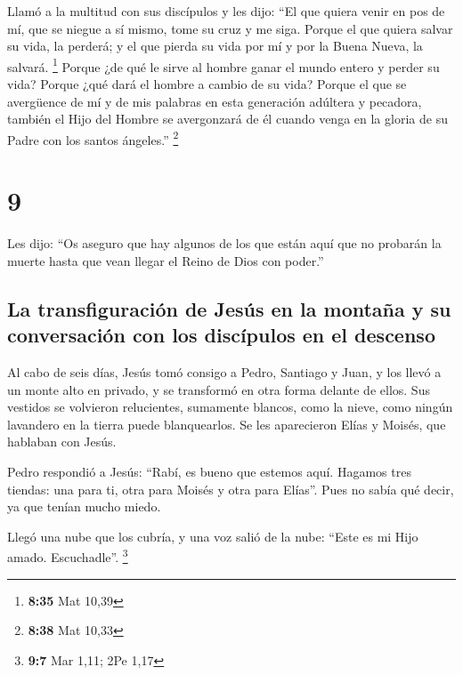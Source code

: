  Llamó a la multitud con sus discípulos y les dijo: ``El
que quiera venir en pos de mí, que se niegue a sí mismo, tome su cruz y
me siga.  Porque el que quiera salvar su vida, la
perderá; y el que pierda su vida por mí y por la Buena Nueva, la
salvará. \footnote{\textbf{8:35} Mat 10,39}  Porque ¿de
qué le sirve al hombre ganar el mundo entero y perder su vida?
 Porque ¿qué dará el hombre a cambio de su vida?
 Porque el que se avergüence de mí y de mis palabras en
esta generación adúltera y pecadora, también el Hijo del Hombre se
avergonzará de él cuando venga en la gloria de su Padre con los santos
ángeles.'' \footnote{\textbf{8:38} Mat 10,33}

\hypertarget{section-8}{%
\section{9}\label{section-8}}

 Les dijo: ``Os aseguro que hay algunos de los que están
aquí que no probarán la muerte hasta que vean llegar el Reino de Dios
con poder.''

\hypertarget{la-transfiguraciuxf3n-de-jesuxfas-en-la-montauxf1a-y-su-conversaciuxf3n-con-los-discuxedpulos-en-el-descenso}{%
\subsection{La transfiguración de Jesús en la montaña y su conversación
con los discípulos en el
descenso}\label{la-transfiguraciuxf3n-de-jesuxfas-en-la-montauxf1a-y-su-conversaciuxf3n-con-los-discuxedpulos-en-el-descenso}}

 Al cabo de seis días, Jesús tomó consigo a Pedro,
Santiago y Juan, y los llevó a un monte alto en privado, y se transformó
en otra forma delante de ellos.  Sus vestidos se volvieron
relucientes, sumamente blancos, como la nieve, como ningún lavandero en
la tierra puede blanquearlos.  Se les aparecieron Elías y
Moisés, que hablaban con Jesús.

 Pedro respondió a Jesús: ``Rabí, es bueno que estemos
aquí. Hagamos tres tiendas: una para ti, otra para Moisés y otra para
Elías''.  Pues no sabía qué decir, ya que tenían mucho
miedo.

 Llegó una nube que los cubría, y una voz salió de la
nube: ``Este es mi Hijo amado. Escuchadle''. \footnote{\textbf{9:7} Mar
  1,11; 2Pe 1,17}

